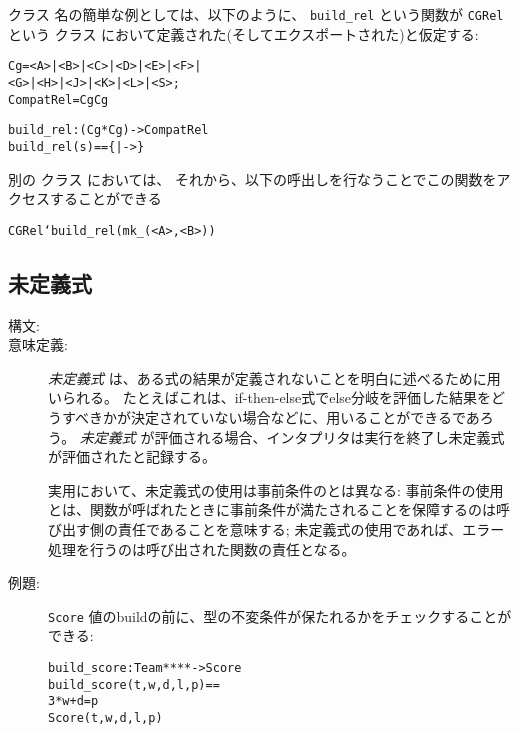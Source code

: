 \documentclass[\pformat,12pt]{jarticle}
\begin{document}
\begin{description}
クラス
名の簡単な例としては、以下のように、 \texttt{build\_rel} という関数が \texttt{CGRel} という
クラス
において定義された(そしてエクスポートされた)と仮定する:
\begin{alltt}

    Cg = <A> | <B> | <C> | <D> | <E> | <F> | 
         <G> | <H> | <J> | <K> | <L> | <S>;
    CompatRel =  Cg  Cg


    build_rel :  (Cg * Cg) -> CompatRel
    build_rel (s) == \{|->\}
\end{alltt}
別の
クラス
においては、
それから、以下の呼出しを行なうことでこの関数をアクセスすることができる
  \begin{alltt}
  CGRel`build_rel({mk_(<A>, <B>)})
  \end{alltt}


\end{description}

\subsection{未定義式}

\begin{description}
\item[構文:]

  
\item[意味定義:] {\it 未定義式} は、ある式の結果が定義されないことを明白に述べるために用いられる。
 たとえばこれは、if-then-else式でelse分岐を評価した結果をどうすべきかが決定されていない場合などに、用いることができるであろう。
{\it 未定義式} が評価される場合、インタプリタは実行を終了し未定義式が評価されたと記録する。

実用において、未定義式の使用は事前条件のとは異なる:
事前条件の使用とは、関数が呼ばれたときに事前条件が満たされることを保障するのは呼び出す側の責任であることを意味する;
未定義式の使用であれば、エラー処理を行うのは呼び出された関数の責任となる。

\item[例題:] \texttt{Score} 値のbuildの前に、型の不変条件が保たれるかをチェックすることができる:

  \begin{alltt}
  build_score : Team *  *  *  *  -> Score
  build_score (t,w,d,l,p) ==
     3 * w + d = p
     Score(t,w,d,l,p)
  \end{alltt}
\end{description}
\end{document}
